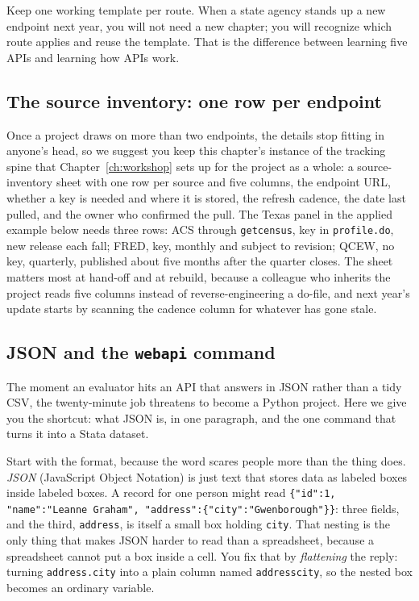 Keep one working template per route. When a state agency stands up a new endpoint next year, you will not need a new chapter; you will recognize which route applies and reuse the template. That is the difference between learning five APIs and learning how APIs work.

\subsection{The source inventory: one row per endpoint}\label{ch03-sc-inventory}
Once a project draws on more than two endpoints, the details stop fitting in anyone's head, so we suggest you keep this chapter's instance of the tracking spine that Chapter~\ref{ch:workshop} sets up for the project as a whole: a source-inventory sheet with one row per source and five columns, the endpoint URL, whether a key is needed and where it is stored, the refresh cadence, the date last pulled, and the owner who confirmed the pull. The Texas panel in the applied example below needs three rows: ACS through \texttt{getcensus}, key in \texttt{profile.do}, new release each fall; FRED, key, monthly and subject to revision; QCEW, no key, quarterly, published about five months after the quarter closes. The sheet matters most at hand-off and at rebuild, because a colleague who inherits the project reads five columns instead of reverse-engineering a do-file, and next year's update starts by scanning the cadence column for whatever has gone stale.

\subsection{JSON and the \texttt{webapi} command}\label{sec:webapi}
The moment an evaluator hits an API that answers in JSON rather than a tidy CSV, the twenty-minute job threatens to become a Python project. Here we give you the shortcut: what JSON is, in one paragraph, and the one command that turns it into a Stata dataset.

Start with the format, because the word scares people more than the thing does. \emph{JSON} (JavaScript Object Notation) is just text that stores data as labeled boxes inside labeled boxes. A record for one person might read \texttt{\{"id":1, "name":"Leanne Graham", "address":\{"city":"Gwenborough"\}\}}: three fields, and the third, \texttt{address}, is itself a small box holding \texttt{city}. That nesting is the only thing that makes JSON harder to read than a spreadsheet, because a spreadsheet cannot put a box inside a cell. You fix that by \emph{flattening} the reply: turning \texttt{address.city} into a plain column named \texttt{addresscity}, so the nested box becomes an ordinary variable.

